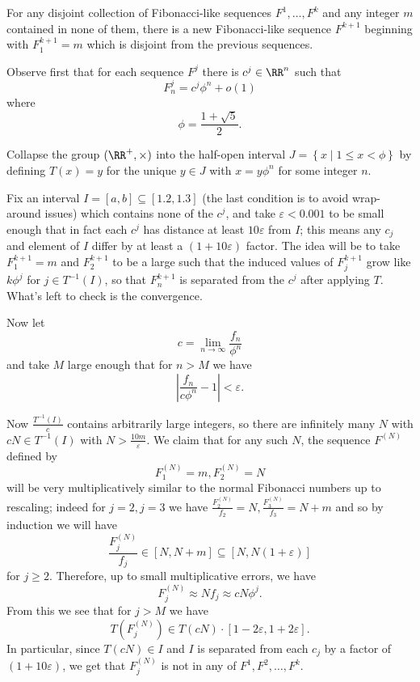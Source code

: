 \documentclass[11pt]{scrartcl}
\begin{document}
\begin{lemma*}
  For any disjoint collection of Fibonacci-like sequences
  $F^1,\dots,F^k$ and any integer $m$ contained in none of them,
  there is a new Fibonacci-like sequence $F^{k+1}$ beginning
  with $F^{k+1}_1=m$ which is disjoint from the previous sequences.
\end{lemma*}

Observe first that for each sequence $F^j$ there is $c^j\in \RR^n$ such that
\[ F^j_n=c^j\phi^n+o(1)  \]
where \[\phi=\frac{1+\sqrt{5}}{2}.\]

Collapse the group $(\RR^+,\times)$ into the half-open interval
$J = \left\{ x \mid 1 \le x < \phi \right\}$
by defining $T(x)=y$ for the unique $y\in J$ with $x=y\phi^n$ for some integer $n$.

Fix an interval $I=[a,b]\subseteq [1.2,1.3]$ (the last condition is to
avoid wrap-around issues) which contains none of the $c^j$, and take
$\varepsilon<0.001$ to be small enough that in fact each $c^j$ has
distance at least $10\varepsilon$ from $I$; this means any $c_j$ and
element of $I$ differ by at least a $(1+10\varepsilon)$ factor. The idea
will be to take $F^{k+1}_1=m$ and $F^{k+1}_2$ to be a large such that
the induced values of $F^{k+1}_j$ grow like $k\phi^j$ for $j\in
T^{-1}(I)$, so that $F^{k+1}_n$ is separated from the $c^j$ after
applying $T$. What's left to check is the convergence.

Now let \[c=\lim_{n\to\infty} \frac{f_n}{\phi^n}\] and take
$M$ large enough that for $n>M$ we have
\[\left|\frac{f_n}{c\phi^n}-1\right|<\varepsilon.\]

Now $\frac{T^{-1}(I)}{c}$ contains arbitrarily large integers,
so there are infinitely many $N$ with $cN\in T^{-1}(I)$ with $N>\frac{10m}{\varepsilon}$.
We claim that for any such $N$, the sequence $F^{(N)}$ defined by
\[F^{(N)}_1=m,F^{(N)}_2=N\] will be very multiplicatively similar to the
normal Fibonacci numbers up to rescaling;
indeed for $j=2,j=3$ we have $\frac{F_2^{(N)}}{f_2}=N,\frac{F_3^{(N)}}{f_3}=N+m$
and so by induction we will have
\[ \frac{F^{(N)}_j}{f_j} \in [N,N+m] \subseteq [N,N(1+\varepsilon)] \]
for $j\geq 2$.
Therefore, up to small multiplicative errors, we have
\[F_j^{(N)}\approx Nf_j\approx cN\phi^j.\]
From this we see that for $j>M$ we have
\[T(F_j^{(N)})\in  T(cN)\cdot [1-2\varepsilon,1+2\varepsilon].\]
In particular, since $T(cN)\in I$ and $I$ is separated from each $c_j$
by a factor of $(1+10\varepsilon)$,
we get that $F_j^{(N)}$ is not in any of $F^1,F^2,\dots,F^k$.
\end{document}
